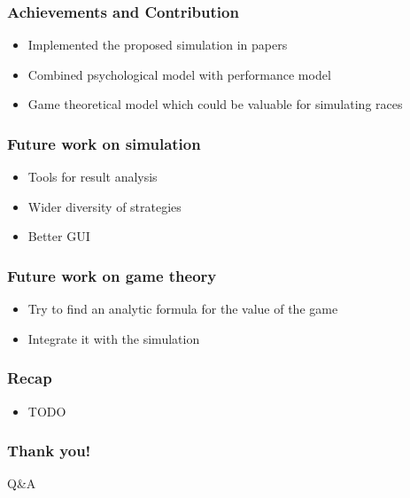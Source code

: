 \documentclass{beamer}
\begin{document}
\begin{frame}
\frametitle{Achievements and Contribution}

\begin{itemize}
	\item Implemented the proposed simulation in papers %
	\item Combined psychological model with performance model
	\item Game theoretical model which could be valuable for simulating races
\end{itemize}

\end{frame}

\begin{frame}
\frametitle{Future work on simulation}
\begin{itemize}
	\item Tools for result analysis
	\item Wider diversity of strategies
	\item Better GUI
\end{itemize}
\end{frame}

\begin{frame}
\frametitle{Future work on game theory}
\begin{itemize}
	\item Try to find an analytic formula for the value of the game
	\item Integrate it with the simulation
\end{itemize}
\end{frame}

\begin{frame}
\frametitle{Recap}

\begin{itemize}
	\item TODO
\end{itemize}

\end{frame}


\begin{frame}
\frametitle{Thank you!}

\huge
\centering Q\&A

\end{frame}

\end{document}
